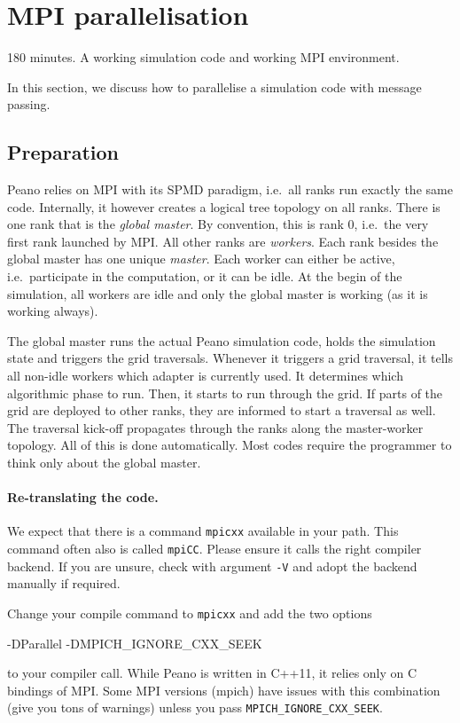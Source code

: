 \section{MPI parallelisation}
  \label{section:parallelisation:mpi}


\chapterDescription
  {
    180 minutes.
  }
  {
    A working simulation code and working MPI environment.
  }

In this section, we discuss how to parallelise a simulation code with message
passing.

\subsection{Preparation}

Peano relies on MPI with its SPMD paradigm, i.e.~all ranks run exactly the same
code.
Internally, it however creates a logical tree topology on all ranks. 
There is one rank that is the {\em global master}.
By convention, this is rank 0, i.e.~the very first rank launched by MPI.
All other ranks are {\em workers}.
Each rank besides the global master has one unique {\em master}.
Each worker can either be active, i.e.~participate in the computation, or it can
be idle.
At the begin of the simulation, all workers are idle and only the global master
is working (as it is working always).

The global master runs the actual Peano simulation code, holds the simulation
state and triggers the grid traversals.
Whenever it triggers a grid traversal, it tells all non-idle workers which
adapter is currently used.
It determines which algorithmic phase to run. 
Then, it starts to run through the grid. 
If parts of the grid are deployed to other ranks, they are informed to start a
traversal as well. 
The traversal kick-off propagates through the ranks along the master-worker
topology.
All of this is done automatically.
Most codes require the programmer to think only about the global master.

\paragraph{Re-translating the code.}
We expect that there is a command \texttt{mpicxx} available in your path.
This command often also is called \texttt{mpiCC}. Please ensure it calls the
right compiler backend. 
If you are unsure, check with argument \texttt{-V} and adopt the backend
manually if required. 

Change your compile command to \texttt{mpicxx} and add the two options
\begin{code}
  -DParallel -DMPICH_IGNORE_CXX_SEEK
\end{code}
to your compiler call.
While Peano is written in C++11, it relies only on C bindings of MPI.
Some MPI versions (mpich) have issues with this combination (give you tons of
warnings) unless you pass \texttt{MPICH\_IGNORE\_CXX\_SEEK}. 


